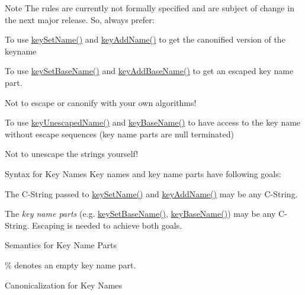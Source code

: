 \begin{DoxyItemize}
\begin{DoxyNote}{Note}
The rules are currently not formally specified and are subject of change in the next major release. So, always prefer\+:
\begin{DoxyItemize}
\item To use \hyperlink{group__keyname_ga7699091610e7f3f43d2949514a4b35d9}{key\+Set\+Name()} and \hyperlink{group__keyname_gaa70593a2c772c4b7bc33423b9b10a270}{key\+Add\+Name()} to get the canonified version of the keyname
\item To use \hyperlink{group__keyname_ga6e804bd453f98c28b0ff51430d1df407}{key\+Set\+Base\+Name()} and \hyperlink{group__keyname_gaa942091fc4bd5c2699e49ddc50829524}{key\+Add\+Base\+Name()} to get an escaped key name part.
\item Not to escape or canonify with your own algorithms!
\item To use \hyperlink{group__keyname_ga6fe6af4c27b35d911a533f4ae4d698bb}{key\+Unescaped\+Name()} and \hyperlink{group__keyname_gaaff35e7ca8af5560c47e662ceb9465f5}{key\+Base\+Name()} to have access to the key name without escape sequences (key name parts are null terminated)
\item Not to unescape the strings yourself!
\end{DoxyItemize}
\end{DoxyNote}
\begin{DoxyParagraph}{Syntax for Key Names}
Key names and key name parts have following goals\+:
\begin{DoxyItemize}
\item The C-\/\+String passed to \hyperlink{group__keyname_ga7699091610e7f3f43d2949514a4b35d9}{key\+Set\+Name()} and \hyperlink{group__keyname_gaa70593a2c772c4b7bc33423b9b10a270}{key\+Add\+Name()} may be any C-\/\+String.
\item The {\itshape key name parts} (e.\+g. \hyperlink{group__keyname_ga6e804bd453f98c28b0ff51430d1df407}{key\+Set\+Base\+Name()}, \hyperlink{group__keyname_gaaff35e7ca8af5560c47e662ceb9465f5}{key\+Base\+Name()}) may be any C-\/\+String. Escaping is needed to achieve both goals.
\end{DoxyItemize}
\end{DoxyParagraph}
\begin{DoxyParagraph}{Semantics for Key Name Parts}

\begin{DoxyItemize}
\item \% denotes an empty key name part.
\end{DoxyItemize}
\end{DoxyParagraph}
\begin{DoxyParagraph}{Canonicalization for Key Names}


\end{DoxyParagraph}
\end{DoxyItemize}

